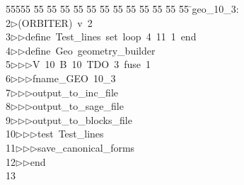 %
%
\begin{tabbing}
55555 \= 55 \= 55 \= 55 \= 55 \= 55 \= 55 \= 55 \= 55 \= 55 \= 55 \= 55 \= 55 \= \>geo\_10\_3:\\[0pt]
2\>$\triangleright$\>(ORBITER)\ v\ 2\ \\[0pt]
3\>$\triangleright$\>$\triangleright$\>define\ Test\_lines\ set\ loop\ 4\ 11\ 1\ end\ \\[0pt]
4\>$\triangleright$\>$\triangleright$\>define\ Geo\ geometry\_builder\ \\[0pt]
5\>$\triangleright$\>$\triangleright$\>$\triangleright$\>V\ 10\ B\ 10\ TDO\ 3\ fuse\ 1\ \\[0pt]
6\>$\triangleright$\>$\triangleright$\>$\triangleright$\>fname\_GEO\ 10\_3\ \\[0pt]
7\>$\triangleright$\>$\triangleright$\>$\triangleright$\>output\_to\_inc\_file\ \\[0pt]
8\>$\triangleright$\>$\triangleright$\>$\triangleright$\>output\_to\_sage\_file\ \\[0pt]
9\>$\triangleright$\>$\triangleright$\>$\triangleright$\>output\_to\_blocks\_file\ \\[0pt]
10\>$\triangleright$\>$\triangleright$\>$\triangleright$\>test\ Test\_lines\ \\[0pt]
11\>$\triangleright$\>$\triangleright$\>$\triangleright$\>save\_canonical\_forms\ \\[0pt]
12\>$\triangleright$\>$\triangleright$\>end\\[0pt]
13\>\end{tabbing}
